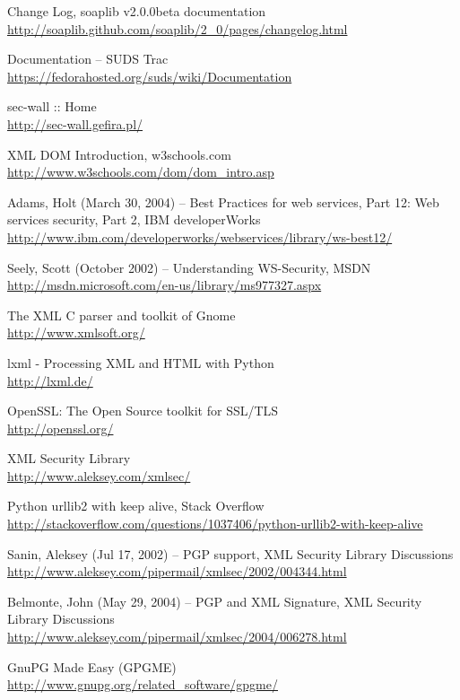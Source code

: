 \begin{thebibliography}{99}
Change Log, soaplib v2.0.0beta documentation\\
\url{http://soaplib.github.com/soaplib/2_0/pages/changelog.html}

Documentation -- SUDS Trac\\
\url{https://fedorahosted.org/suds/wiki/Documentation}

sec-wall :: Home\\
\url{http://sec-wall.gefira.pl/}

XML DOM Introduction, w3schools.com\\
\url{http://www.w3schools.com/dom/dom_intro.asp}

Adams, Holt (March 30, 2004) -- Best Practices for web services, Part 12: Web services security, Part 2, IBM developerWorks\\
\url{http://www.ibm.com/developerworks/webservices/library/ws-best12/}

Seely, Scott (October 2002) -- Understanding WS-Security, MSDN\\
\url{http://msdn.microsoft.com/en-us/library/ms977327.aspx}

The XML C parser and toolkit of Gnome\\
\url{http://www.xmlsoft.org/}

lxml - Processing XML and HTML with Python\\
\url{http://lxml.de/}

OpenSSL: The Open Source toolkit for SSL/TLS\\
\url{http://openssl.org/}

XML Security Library\\
\url{http://www.aleksey.com/xmlsec/}

Python urllib2 with keep alive, Stack Overflow\\
\url{http://stackoverflow.com/questions/1037406/python-urllib2-with-keep-alive}

Sanin, Aleksey (Jul 17, 2002) -- PGP support, XML Security Library Discussions\\
\url{http://www.aleksey.com/pipermail/xmlsec/2002/004344.html}

Belmonte, John (May 29, 2004) -- PGP and XML Signature, XML Security Library Discussions\\
\url{http://www.aleksey.com/pipermail/xmlsec/2004/006278.html}

GnuPG Made Easy (GPGME)\\
\url{http://www.gnupg.org/related_software/gpgme/}

\end{thebibliography}
